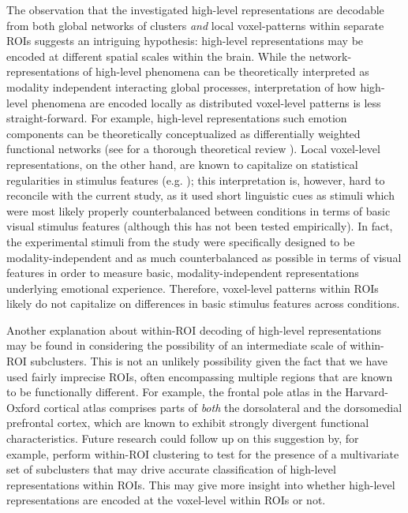 \documentclass[jou,12pt,a4paper]{apa6}
\begin{document}
The observation that the investigated high-level representations are decodable from both global networks of clusters \emph{and} local voxel-patterns within separate ROIs suggests an intriguing hypothesis: high-level representations may be encoded at different spatial scales within the brain. While the network-representations of high-level phenomena can be theoretically interpreted as modality independent interacting global processes, interpretation of how high-level phenomena are encoded locally as distributed voxel-level patterns is less straight-forward. For example, high-level representations such emotion components can be theoretically conceptualized as differentially weighted functional networks (see for a thorough theoretical review ). Local voxel-level representations, on the other hand, are known to capitalize on statistical regularities in stimulus features (e.g. ); this interpretation is, however, hard to reconcile with the current study, as it used short linguistic cues as stimuli which were most likely properly counterbalanced between conditions in terms of basic visual stimulus features (although this has not been tested empirically). In fact, the experimental stimuli from the  study were specifically designed to be modality-independent and as much counterbalanced as possible in terms of visual features in order to measure basic, modality-independent representations underlying emotional experience. Therefore, voxel-level patterns within ROIs likely do not capitalize on differences in basic stimulus features across conditions. 

Another explanation about within-ROI decoding of high-level representations may be found in considering the possibility of an intermediate scale of within-ROI subclusters. This is not an unlikely possibility given the fact that we have used fairly imprecise ROIs, often encompassing multiple regions that are known to be functionally different. For example, the frontal pole atlas in the Harvard-Oxford cortical atlas comprises parts of \emph{both} the dorsolateral and the dorsomedial prefrontal cortex, which are known to exhibit strongly divergent functional characteristics. Future research could follow up on this suggestion by, for example, perform within-ROI clustering to test for the presence of a multivariate set of subclusters that may drive accurate classification of high-level representations within ROIs. This may give more insight into whether high-level representations are encoded at the voxel-level within ROIs or not.
\end{document}
